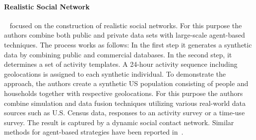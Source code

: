 
\paragraph{Realistic Social Network}
~\cite{Barrett:2009:GAL:1995456.1995598} focused on the construction of
realistic social networks. For this purpose the authors combine both public and private data sets
with large-scale agent-based techniques. The process works as follows: In the first step
it generates a synthetic data by combining public and commercial databases. In the second step, it determines a set of activity templates. A 24-hour activity sequence including
geolocations is assigned to each synthetic individual. To demonstrate the approach, the authors create a synthetic US population consisting of people and households together with respective geolocations. For this purpose the authors combine simulation and data fusion techniques utilizing various real-world data sources such as U.S. Census data, responses to an activity survey or a time-use survey. %
The result is captured by a dynamic social contact network. Similar methods for agent-based strategies have been reported in~\cite{Bernstein:2013:SAS:2499604.2499609}.

